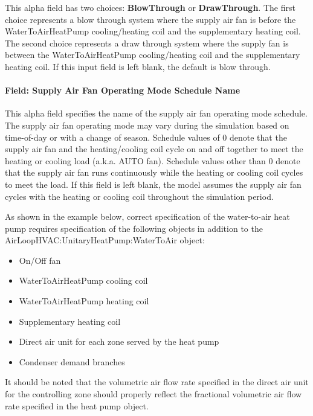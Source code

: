 This alpha field has two choices: \textbf{BlowThrough} or \textbf{DrawThrough}. The first choice represents a blow through system where the supply air fan is before the WaterToAirHeatPump cooling/heating coil and the supplementary heating coil. The second choice represents a draw through system where the supply fan is between the WaterToAirHeatPump cooling/heating coil and the supplementary heating coil. If this input field is left blank, the default is blow through.

\paragraph{Field: Supply Air Fan Operating Mode Schedule Name}\label{field-supply-air-fan-operating-mode-schedule-name-2}

This alpha field specifies the name of the supply air fan operating mode schedule. The supply air fan operating mode may vary during the simulation based on time-of-day or with a change of season. Schedule values of 0 denote that the supply air fan and the heating/cooling coil cycle on and off together to meet the heating or cooling load (a.k.a. AUTO fan). Schedule values other than 0 denote that the supply air fan runs continuously while the heating or cooling coil cycles to meet the load. If this field is left blank, the model assumes the supply air fan cycles with the heating or cooling coil throughout the simulation period.

As shown in the example below, correct specification of the water-to-air heat pump requires specification of the following objects in addition to the AirLoopHVAC:UnitaryHeatPump:WaterToAir object:

\begin{itemize}
\item
  On/Off fan
\item
  WaterToAirHeatPump cooling coil
\item
  WaterToAirHeatPump heating coil
\item
  Supplementary heating coil
\item
  Direct air unit for each zone served by the heat pump
\item
  Condenser demand branches
\end{itemize}

It should be noted that the volumetric air flow rate specified in the direct air unit for the controlling zone should properly reflect the fractional volumetric air flow rate specified in the heat pump object.

